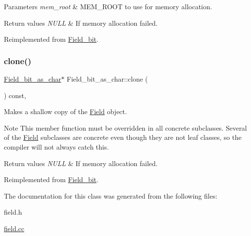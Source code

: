 \begin{DoxyParams}{Parameters}
{\em mem\+\_\+root} & M\+E\+M\+\_\+\+R\+O\+OT to use for memory allocation. \\
\hline
\end{DoxyParams}

\begin{DoxyRetVals}{Return values}
{\em N\+U\+LL} & If memory allocation failed. \\
\hline
\end{DoxyRetVals}


Reimplemented from \mbox{\hyperlink{classField__bit_aeb78600782993f9f9b6eb5b24de2e527}{Field\+\_\+bit}}.

\mbox{\label{classField__bit__as__char_a03166b5ed4492fcb071fd377c4c5e1b8}} 
\subsubsection{\texorpdfstring{clone()}{clone()}\hspace{0.1cm}{\footnotesize\ttfamily [2/2]}}
{\footnotesize\ttfamily \mbox{\hyperlink{classField__bit__as__char}{Field\+\_\+bit\+\_\+as\+\_\+char}}$\ast$ Field\+\_\+bit\+\_\+as\+\_\+char\+::clone (\begin{DoxyParamCaption}{ }\end{DoxyParamCaption}) const\hspace{0.3cm}{\ttfamily [inline]}, {\ttfamily [virtual]}}

Makes a shallow copy of the \mbox{\hyperlink{classField}{Field}} object.

\begin{DoxyNote}{Note}
This member function must be overridden in all concrete subclasses. Several of the \mbox{\hyperlink{classField}{Field}} subclasses are concrete even though they are not leaf classes, so the compiler will not always catch this.
\end{DoxyNote}

\begin{DoxyRetVals}{Return values}
{\em N\+U\+LL} & If memory allocation failed. \\
\hline
\end{DoxyRetVals}


Reimplemented from \mbox{\hyperlink{classField__bit_a666845df221e87fbc65c725c232e4afd}{Field\+\_\+bit}}.



The documentation for this class was generated from the following files\+:\begin{DoxyCompactItemize}
\item 
field.\+h\item 
\mbox{\hyperlink{field_8cc}{field.\+cc}}\end{DoxyCompactItemize}
